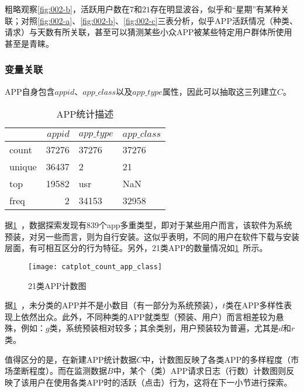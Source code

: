 \documentclass[withoutpreface,bwprint]{cumcmthesis}
\begin{document}
粗略观察\cref{fig:002-b}，活跃用户数在$7$和$21$存在明显波谷，似乎和“星期”有某种关联；对照\cref{fig:002-a}、\cref{fig:002-b}、\cref{fig:002-c}三表分析，似乎APP活跃情况（种类、请求）与天数有所关联，甚至可以猜测某些小众APP被某些特定用户群体所使用甚至是青睐。

\subsubsection{变量关联}

APP自身包含$appid$、$app\_class$以及$app\_type$属性，因此可以抽取这三列建立$C$。

\begin{table}[!htbp]
    \caption{APP统计描述}\label{tab:003} \centering
    \begin{tabular}{lrll}
        \toprule
               & $appid$ & $app\_type$ & $app\_class$ \\
        \midrule
        count  & 37276   & 37276       & 37276        \\
        unique & 36437   & 2           & 21           \\
        top    & 19582   & usr         & NaN          \\
        freq   & 2       & 34153       & 32958        \\
        \bottomrule
    \end{tabular}
\end{table}

据\cref{tab:003}~，数据探索发现有839个app多重类型，即对于某些用户而言，该软件为系统预装，对另一些而言，则为自行安装。这似乎表明，不同的用户在软件下载与安装层面，有可相互区分的行为特征。另外，21类APP的数量情况如\cref{fig:003}~所示。

\begin{figure}[!htbp]
    \centering
    \texttt{[image: catplot\_count\_app\_class]}
    \caption{21类APP计数图}
    \label{fig:003}
\end{figure}

据\cref{fig:003}~，未分类的APP并不是小数目（有一部分为系统预装），$t$类在APP多样性表现上依然出众。此外，不同种类的APP就类型（预装、用户）而言相差较为悬殊，例如：$g$类，系统预装相对较多；其余类别，用户预装较为普遍，尤其是$d$和$r$类。

值得区分的是，在新建APP统计数据$C$中，计数图反映了各类APP的多样程度（市场垄断程度）。而在监测数据$B$中，某个（类）APP请求日志（行数）计数图则反映了该用户在使用各类APP时的活跃（点击）行为，这将在下一小节进行探索。
\end{document}

